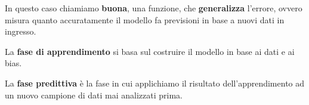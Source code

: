 In questo caso chiamiamo \textbf{buona}, una funzione, che \textbf{generalizza} l'errore, ovvero misura
quanto accuratamente il modello fa previsioni in base a nuovi dati in ingresso.

La \textbf{fase di apprendimento} si basa sul costruire il modello in base ai dati e ai bias.

La \textbf{fase predittiva} \`e la fase in cui applichiamo il risultato dell'apprendimento ad un nuovo campione di
dati mai analizzati prima.